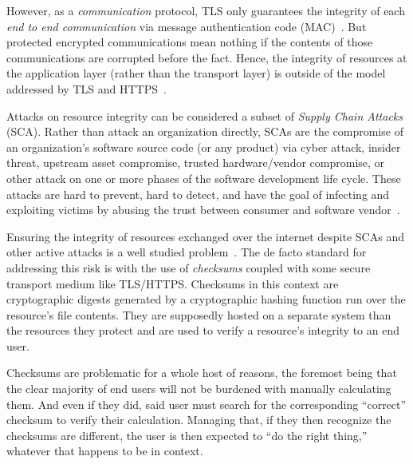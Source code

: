 However, as a \textit{communication} protocol, TLS only guarantees the integrity
of each \textit{end to end communication} via message authentication code
(MAC)~\cite{TLS1.2}. But protected encrypted communications mean nothing if the
contents of those communications are corrupted before the fact. Hence, the
integrity of resources at the application layer (rather than the transport
layer) is outside of the model addressed by TLS and HTTPS~\cite{TLS1.2, HTTPS}.

Attacks on resource integrity can be considered a subset of \emph{Supply Chain
Attacks} (SCA). Rather than attack an organization directly, SCAs are
the compromise of an organization's software source code (or any product) via
cyber attack, insider threat, upstream asset compromise, trusted hardware/vendor
compromise, or other attack on one or more phases of the software development
life cycle. These attacks are hard to prevent, hard to detect, and have the goal
of infecting and exploiting victims by abusing the trust between consumer and
software vendor~\cite{SCA}.


Ensuring the integrity of resources exchanged over the internet despite SCAs and
other active attacks is a well studied problem~\cite{MD5Header, HTTP1.1, HTTPS,
SRI, LF, OpenPGP1, DNSSEC, PKI}. The de facto standard for addressing this risk
is with the use of \textit{checksums} coupled with some secure transport medium
like TLS/HTTPS. Checksums in this context are cryptographic digests generated by
a cryptographic hashing function run over the resource's file contents. They are
supposedly hosted on a separate system than the resources they protect and are
used to verify a resource’s integrity to an end user.



Checksums are problematic for a whole host of reasons, the foremost being that
the clear majority of end users will not be burdened with manually calculating
them. And even if they did, said user must search for the corresponding
``correct'' checksum to verify their calculation. Managing that, if they then
recognize the checksums are different, the user is then expected to ``do the
right thing,'' whatever that happens to be in context.

